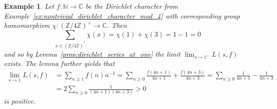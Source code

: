 \documentclass{scrartcl}
\newcommand{\N}{\mathbb{N}}
\newcommand{\Z}{\mathbb{Z}}
\newcommand{\C}{\mathbb{C}}
\newcommand{\units}{\times}
\newtheorem{example}[definition]{Example}
\begin{document}
\begin{example}
    Let $f: \N \to \C$ be the Dirichlet character from Example~\ref{ex:nontrivial_dirichlet_character_mod_4} with corresponding group homomorphism $\chi: (\Z/4\Z)^\units \to \C$.
    Then
    \begin{equation*}
        \sum_{x \in (\Z/4\Z)^*} \chi(x) = \chi(1) + \chi(3) = 1 - 1 = 0
    \end{equation*}
    and so by Lemma~\ref{prop:dirichlet_series_at_one} the limit $\lim_{s \to 1^+} L(s, f)$ exists.
    The lemma further yields that
    \begin{align*}
        \lim_{s \to 1} L(s, f) &= \sum_{n \geq 1} f(n) n^{-1} = \sum_{n \geq 0} \frac {f(4n + 1)} {4n + 1} + \frac {f(4n + 3)} {4n + 3} = \sum_{n \geq 0} \frac 1 {4n + 1} - \frac 1 {4n + 3} \\
        &= 2 \sum_{n \geq 0} \frac 1 {(4n + 1)(4n + 3)} > 0
    \end{align*}
    is positive.
\end{example}

\printbibliography
\end{document}

